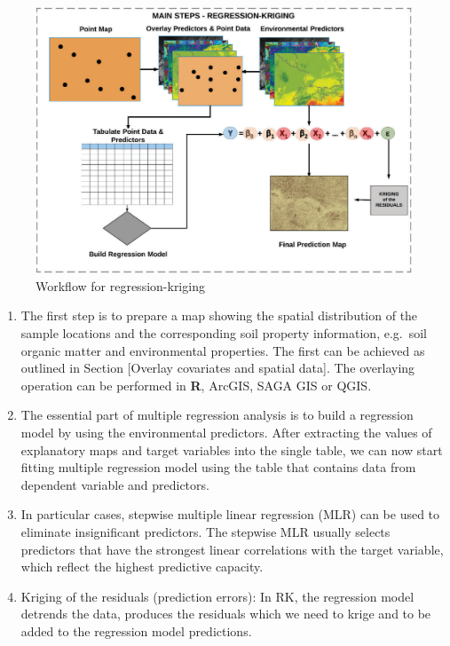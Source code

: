 \documentclass[10pt,b5paper,]{book}
\providecommand{\tightlist}{%
  \setlength{\itemsep}{0pt}\setlength{\parskip}{0pt}}
\theoremstyle{definition}
\theoremstyle{definition}
\theoremstyle{definition}
\theoremstyle{remark}
\begin{document}
\begin{figure}

{\centering \includegraphics[width=0.8\linewidth]{images/RKworkflow} 

}

\caption{Workflow for regression-kriging}\label{fig:workflowRK}
\end{figure}

\begin{enumerate}
\def\labelenumi{\arabic{enumi}.}
\tightlist
\item
  The first step is to prepare a map showing the spatial distribution of
  the sample locations and the corresponding soil property information,
  e.g.~soil organic matter and environmental properties. The first can
  be achieved as outlined in Section {[}Overlay covariates and spatial
  data{]}. The overlaying operation can be performed in \textbf{R},
  ArcGIS, SAGA GIS or QGIS.
\item
  The essential part of multiple regression analysis is to build a
  regression model by using the environmental predictors. After
  extracting the values of explanatory maps and target variables into
  the single table, we can now start fitting multiple regression model
  using the table that contains data from dependent variable and
  predictors.
\item
  In particular cases, stepwise multiple linear regression (MLR) can be
  used to eliminate insignificant predictors. The stepwise MLR usually
  selects predictors that have the strongest linear correlations with
  the target variable, which reflect the highest predictive capacity.
\item
  Kriging of the residuals (prediction errors): In RK, the regression
  model detrends the data, produces the residuals which we need to krige
  and to be added to the regression model predictions.
\end{enumerate}
\end{document}
